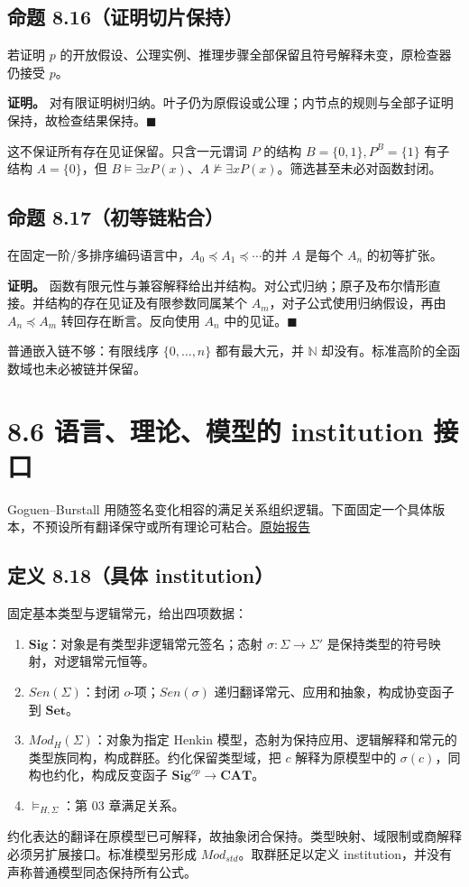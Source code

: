 \documentclass[UTF8,a4paper,zihao=-4,fontset=windows,openany]{ctexbook}
\def\mathrm#1{#1}%
\begin{document}
\subsection{命题 8.16（证明切片保持）}
若证明 \(p\) 的开放假设、公理实例、推理步骤全部保留且符号解释未变，原检查器仍接受 \(p\)。

\textbf{证明。} 对有限证明树归纳。叶子仍为原假设或公理；内节点的规则与全部子证明保持，故检查结果保持。\(\blacksquare\)

这不保证所有存在见证保留。只含一元谓词 \(P\) 的结构 \(B=\{0,1\},P^B=\{1\}\) 有子结构 \(A=\{0\}\)，但 \(B\models\exists xP(x)\)、\(A\not\models\exists xP(x)\)。筛选甚至未必对函数封闭。

\subsection{命题 8.17（初等链粘合）}
在固定一阶/多排序编码语言中，\(A_0\preccurlyeq A_1\preccurlyeq\cdots\)的并 \(A\) 是每个 \(A_n\) 的初等扩张。

\textbf{证明。} 函数有限元性与兼容解释给出并结构。对公式归纳；原子及布尔情形直接。并结构的存在见证及有限参数同属某个 \(A_m\)，对子公式使用归纳假设，再由 \(A_n\preccurlyeq A_m\) 转回存在断言。反向使用 \(A_n\) 中的见证。\(\blacksquare\)

普通嵌入链不够：有限线序 \(\{0,\ldots,n\}\) 都有最大元，并 \(\mathbb N\) 却没有。标准高阶的全函数域也未必被链并保留。

\section{8.6 语言、理论、模型的 institution 接口}
Goguen–Burstall 用随签名变化相容的满足关系组织逻辑。下面固定一个具体版本，不预设所有翻译保守或所有理论可粘合。\href{https://publish.lfcs.inf.ed.ac.uk/reports/90/ECS-LFCS-90-106/}{原始报告}

\subsection{定义 8.18（具体 institution）}
固定基本类型与逻辑常元，给出四项数据：

\begin{enumerate}
\item \(\mathbf{Sig}\)：对象是有类型非逻辑常元签名；态射 \(\sigma:\Sigma\to\Sigma'\) 是保持类型的符号映射，对逻辑常元恒等。
\item \(\mathrm{Sen}(\Sigma)\)：封闭 \(o\)-项；\(\mathrm{Sen}(\sigma)\) 递归翻译常元、应用和抽象，构成协变函子到 \(\mathbf{Set}\)。
\item \(\mathrm{Mod}_H(\Sigma)\)：对象为指定 Henkin 模型，态射为保持应用、逻辑解释和常元的类型族同构，构成群胚。约化保留类型域，把 \(c\) 解释为原模型中的 \(\sigma(c)\)，同构也约化，构成反变函子 \(\mathbf{Sig}^{op}\to\mathbf{CAT}\)。
\item \(\models_{H,\Sigma}\)：第 03 章满足关系。
\end{enumerate}
约化表达的翻译在原模型已可解释，故抽象闭合保持。类型映射、域限制或商解释必须另扩展接口。标准模型另形成 \(\mathrm{Mod}_{std}\)。取群胚足以定义 institution，并没有声称普通模型同态保持所有公式。
\end{document}

